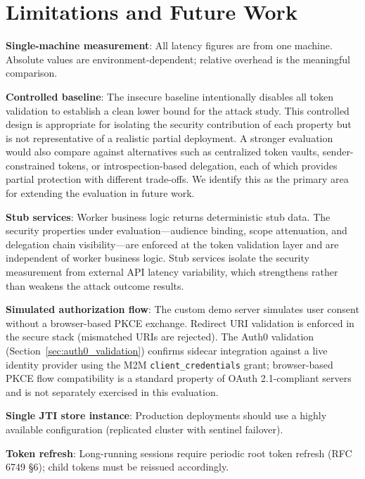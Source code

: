 \documentclass[journal]{IEEEtran}
\theoremstyle{definition}
\begin{document}
\section{Limitations and Future Work}
\label{sec:limitations}

\textbf{Single-machine measurement}: All latency figures are from one machine.
Absolute values are environment-dependent; relative overhead is the meaningful
comparison.

\textbf{Controlled baseline}: The insecure baseline intentionally disables all
token validation to establish a clean lower bound for the attack study. This
controlled design is appropriate for isolating the security contribution of each
property but is not representative of a realistic partial deployment. A stronger
evaluation would also compare against alternatives such as centralized token
vaults, sender-constrained tokens, or introspection-based delegation, each of
which provides partial protection with different trade-offs. We identify this
as the primary area for extending the evaluation in future work.

\textbf{Stub services}: Worker business logic returns deterministic stub data.
The security properties under evaluation---audience binding, scope attenuation,
and delegation chain visibility---are enforced at the token validation layer and
are independent of worker business logic. Stub services isolate the security
measurement from external API latency variability, which strengthens rather than
weakens the attack outcome results.

\textbf{Simulated authorization flow}: The custom demo server simulates user
consent without a browser-based PKCE exchange. Redirect URI validation is
enforced in the secure stack (mismatched URIs are rejected). The Auth0
validation (Section~\ref{sec:auth0_validation}) confirms sidecar integration
against a live identity provider using the M2M \texttt{client\_credentials}
grant; browser-based PKCE flow compatibility is a standard property of
OAuth 2.1-compliant servers and is not separately exercised in this evaluation.

\textbf{Single JTI store instance}: Production deployments should use a
highly available configuration (replicated cluster with sentinel failover).

\textbf{Token refresh}: Long-running sessions require periodic root token refresh
(RFC 6749 §6); child tokens must be reissued accordingly.
\end{document}
